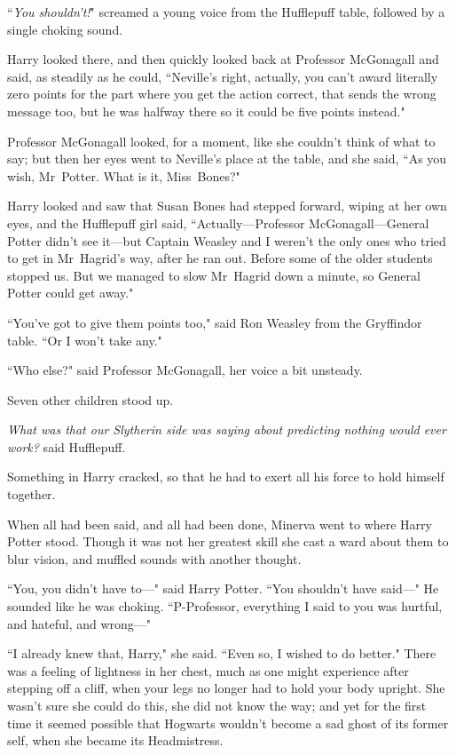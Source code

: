``\emph{You shouldn't!}" screamed a young voice from the Hufflepuff table, followed by a single choking sound.

Harry looked there, and then quickly looked back at Professor McGonagall and said, as steadily as he could, ``Neville's right, actually, you can't award literally zero points for the part where you get the action correct, that sends the wrong message too, but he was halfway there so it could be five points instead."

Professor McGonagall looked, for a moment, like she couldn't think of what to say; but then her eyes went to Neville's place at the table, and she said, ``As you wish, Mr~Potter. What is it, Miss~Bones?"

Harry looked and saw that Susan Bones had stepped forward, wiping at her own eyes, and the Hufflepuff girl said, ``Actually—Professor McGonagall—General Potter didn't see it—but Captain Weasley and I weren't the only ones who tried to get in Mr~Hagrid's way, after he ran out. Before some of the older students stopped us. But we managed to slow Mr~Hagrid down a minute, so General Potter could get away."

``You've got to give them points too," said Ron Weasley from the Gryffindor table. ``Or I won't take any."

``Who else?" said Professor McGonagall, her voice a bit unsteady.

Seven other children stood up.

\emph{What was that our Slytherin side was saying about predicting nothing would ever work?} said Hufflepuff.

Something in Harry cracked, so that he had to exert all his force to hold himself together.

\later

When all had been said, and all had been done, Minerva went to where Harry Potter stood. Though it was not her greatest skill she cast a ward about them to blur vision, and muffled sounds with another thought.

``You, you didn't have to—" said Harry Potter. ``You shouldn't have said—" He sounded like he was choking. ``P-Professor, everything I said to you was hurtful, and hateful, and wrong—"

``I already knew that, Harry," she said. ``Even so, I wished to do better." There was a feeling of lightness in her chest, much as one might experience after stepping off a cliff, when your legs no longer had to hold your body upright. She wasn't sure she could do this, she did not know the way; and yet for the first time it seemed possible that Hogwarts wouldn't become a sad ghost of its former self, when she became its Headmistress.

